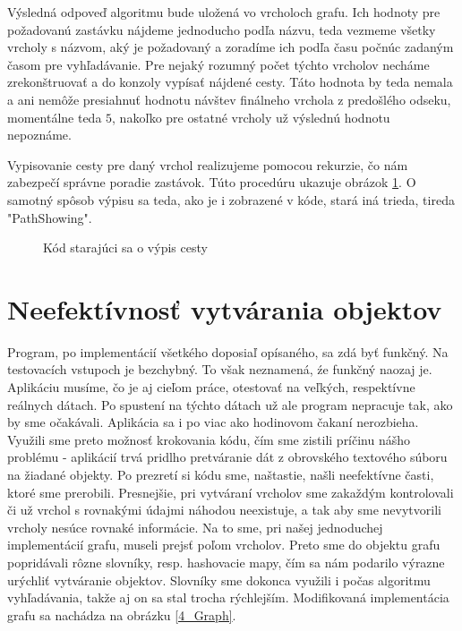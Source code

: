 Výsledná odpoveď algoritmu bude uložená vo vrcholoch grafu. Ich hodnoty pre požadovanú zastávku nájdeme jednoducho podľa názvu, teda vezmeme všetky vrcholy s názvom, aký je požadovaný a zoradíme ich podľa času počnúc zadaným časom pre vyhľadávanie. Pre nejaký rozumný počet týchto vrcholov necháme zrekonštruovať a do konzoly vypísať nájdené cesty. Táto hodnota by teda nemala a ani nemôže presiahnuť hodnotu návštev finálneho vrchola z predošlého odseku, momentálne teda $5$, nakoľko pre ostatné vrcholy už výslednú hodnotu nepoznáme.\newline

Vypisovanie cesty pre daný vrchol realizujeme pomocou rekurzie, čo nám zabezpečí správne poradie zastávok. Túto procedúru ukazuje obrázok \ref{PathShowing}. O samotný spôsob výpisu sa teda, ako je i zobrazené v kóde, stará iná trieda, tireda "PathShowing".\newline

\begin{figure}[H]
  \caption{Kód starajúci sa o výpis cesty}
  \label{PathShowing}
\end{figure}


\section{Neefektívnosť vytvárania objektov}

Program, po implementácií všetkého doposiaľ opísaného, sa zdá byť funkčný. Na testovacích vstupoch je bezchybný. To však neznamená, źe funkčný naozaj je. Aplikáciu musíme, čo je aj cieľom práce, otestovať na veľkých, respektívne reálnych dátach. Po spustení na týchto dátach už ale program nepracuje tak, ako by sme očakávali. Aplikácia sa i po viac ako hodinovom čakaní nerozbieha. Využili sme preto možnosť krokovania kódu, čím sme zistili príčinu nášho problému - aplikácií trvá pridlho pretváranie dát z obrovského textového súboru na žiadané objekty. Po prezretí si kódu sme, naštastie, našli neefektívne časti, ktoré sme prerobili. Presnejšie, pri vytváraní vrcholov sme zakaždým kontrolovali či už vrchol s rovnakými údajmi náhodou neexistuje, a tak aby sme nevytvorili vrcholy nesúce rovnaké informácie. Na to sme, pri našej jednoduchej implementácií grafu, museli prejsť poľom vrcholov. Preto sme do objektu grafu popridávali rôzne slovníky, resp. hashovacie mapy, čím sa nám podarilo výrazne urýchliť vytváranie objektov. Slovníky sme dokonca využili i počas algoritmu vyhľadávania, takže aj on sa stal trocha rýchlejším. Modifikovaná implementácia grafu sa nachádza na obrázku \ref{4_Graph}.\newline

